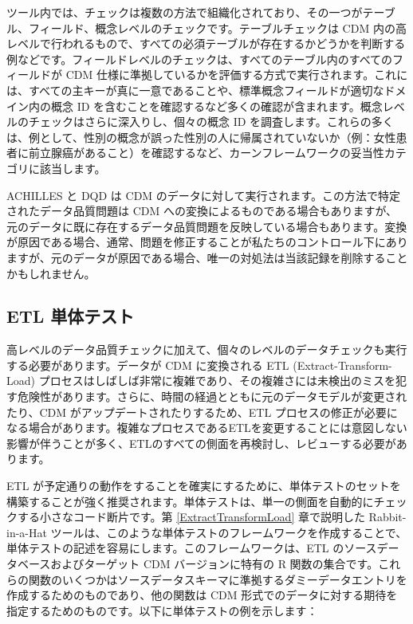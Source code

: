 \documentclass[
  11pt]{book}
\makeatletter
\newenvironment{kframe}{%
\medskip{}
\setlength{\fboxsep}{.8em}
 \def\at@end@of@kframe{}%
 \ifinner\ifhmode%
  \def\at@end@of@kframe{\end{minipage}}%
  \begin{minipage}{\columnwidth}%
 \fi\fi%
 \def\FrameCommand##1{\hskip\@totalleftmargin \hskip-\fboxsep
 \colorbox{myShadeColor}{##1}\hskip-\fboxsep
     \hskip-\linewidth \hskip-\@totalleftmargin \hskip\columnwidth}%
 \MakeFramed {\advance\hsize-\width
   \@totalleftmargin\z@ \linewidth\hsize
   \@setminipage}}%
 {\par\unskip\endMakeFramed%
 \at@end@of@kframe}
\newenvironment{rmdblock}[1]
  {
  \begin{itemize}
  \renewcommand{\labelitemi}{
    \raisebox{-.7\height}[0pt][0pt]{
      {\setkeys{Gin}{width=3em,keepaspectratio}\texttt{[image: images/\#1]}}
    }
  }
  \setlength{\fboxsep}{1em}
  \begin{kframe}
  \item
  }
  {
  \end{kframe}
  \end{itemize}
  }
\newenvironment{rmdimportant}
  {\begin{rmdblock}{important}}
  {\end{rmdblock}}
\theoremstyle{definition}
\theoremstyle{definition}
\theoremstyle{definition}
\theoremstyle{definition}
\theoremstyle{remark}
\makeatother
\begin{document}
ツール内では、チェックは複数の方法で組織化されており、その一つがテーブル、フィールド、概念レベルのチェックです。テーブルチェックは CDM 内の高レベルで行われるもので、すべての必須テーブルが存在するかどうかを判断する例などです。フィールドレベルのチェックは、すべてのテーブル内のすべてのフィールドが CDM 仕様に準拠しているかを評価する方式で実行されます。これには、すべての主キーが真に一意であることや、標準概念フィールドが適切なドメイン内の概念 ID を含むことを確認するなど多くの確認が含まれます。概念レベルのチェックはさらに深入りし、個々の概念 ID を調査します。これらの多くは、例として、性別の概念が誤った性別の人に帰属されていないか（例：女性患者に前立腺癌があること）を確認するなど、カーンフレームワークの妥当性カテゴリに該当します。

\begin{rmdimportant}
ACHILLES と DQD は CDM のデータに対して実行されます。この方法で特定されたデータ品質問題は CDM への変換によるものである場合もありますが、元のデータに既に存在するデータ品質問題を反映している場合もあります。変換が原因である場合、通常、問題を修正することが私たちのコントロール下にありますが、元のデータが原因である場合、唯一の対処法は当該記録を削除することかもしれません。
\end{rmdimportant}

\subsection{ETL 単体テスト}\label{etlUnitTests}


高レベルのデータ品質チェックに加えて、個々のレベルのデータチェックも実行する必要があります。データが CDM に変換される ETL (Extract-Transform-Load) プロセスはしばしば非常に複雑であり、その複雑さには未検出のミスを犯す危険性があります。さらに、時間の経過とともに元のデータモデルが変更されたり、CDM がアップデートされたりするため、ETL プロセスの修正が必要になる場合があります。複雑なプロセスであるETLを変更することには意図しない影響が伴うことが多く、ETLのすべての側面を再検討し、レビューする必要があります。

ETL が予定通りの動作をすることを確実にするために、単体テストのセットを構築することが強く推奨されます。単体テストは、単一の側面を自動的にチェックする小さなコード断片です。第 \ref{ExtractTransformLoad} 章で説明した Rabbit-in-a-Hat ツールは、このような単体テストのフレームワークを作成することで、単体テストの記述を容易にします。このフレームワークは、ETL のソースデータベースおよびターゲット CDM バージョンに特有の R 関数の集合です。これらの関数のいくつかはソースデータスキーマに準拠するダミーデータエントリを作成するためのものであり、他の関数は CDM 形式でのデータに対する期待を指定するためのものです。以下に単体テストの例を示します：
\end{document}
